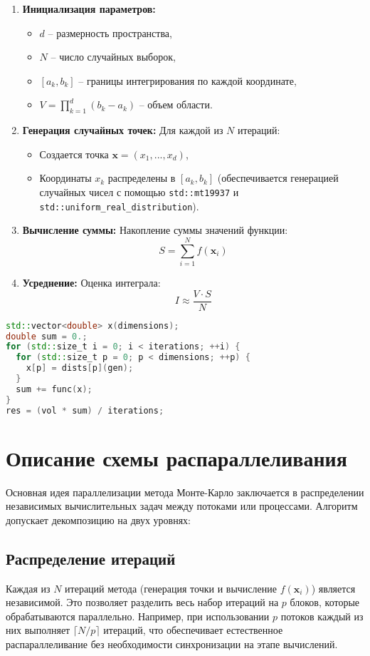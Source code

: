 \documentclass[a4paper,12pt]{article}
\begin{document}
\begin{enumerate}
\item \textbf{Инициализация параметров:}
\begin{itemize}
\item $d$ -- размерность пространства,
\item $N$ -- число случайных выборок,
\item $[a_k, b_k]$ -- границы интегрирования по каждой координате,
\item $V = \prod_{k=1}^d (b_k - a_k)$ -- объем области.
\end{itemize}

\item \textbf{Генерация случайных точек:} Для каждой из $N$ итераций:
\begin{itemize}
\item Создается точка $\mathbf{x} = (x_1, ..., x_d)$,
\item Координаты $x_k$ распределены в $[a_k, b_k]$ (обеспечивается генерацией случайных чисел с помощью \texttt{std::mt19937} и \texttt{std::uniform\_real\_distribution}).
\end{itemize}

\item \textbf{Вычисление суммы:} Накопление суммы значений функции:
\[
S = \sum_{i=1}^N f(\mathbf{x}_i)
\]

\item \textbf{Усреднение:} Оценка интеграла:
\[
I \approx \frac{V \cdot S}{N}
\]
\end{enumerate}
\begin{lstlisting}[language=C++, caption=Ключевой фрагмент реализации]
std::vector<double> x(dimensions);
double sum = 0.;
for (std::size_t i = 0; i < iterations; ++i) {
  for (std::size_t p = 0; p < dimensions; ++p) {
    x[p] = dists[p](gen);
  }
  sum += func(x);
}
res = (vol * sum) / iterations;
\end{lstlisting}

\newpage

\section{Описание схемы распараллеливания}

Основная идея параллелизации метода Монте-Карло заключается в распределении независимых вычислительных задач между потоками или процессами. Алгоритм допускает декомпозицию на двух уровнях: 

\subsection{Распределение итераций}
Каждая из \( N \) итераций метода (генерация точки и вычисление \( f(\mathbf{x}_i) \)) является независимой. Это позволяет разделить весь набор итераций на \( p \) блоков, которые обрабатываются параллельно. Например, при использовании \( p \) потоков каждый из них выполняет \( \lceil N/p \rceil \) итераций, что обеспечивает естественное распараллеливание без необходимости синхронизации на этапе вычислений.
\end{document}
